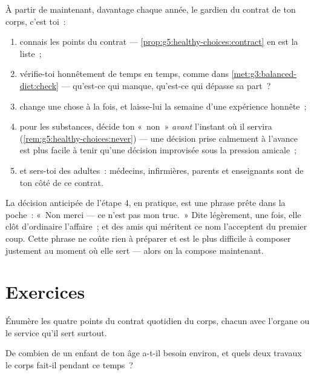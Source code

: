 \begin{method}\label{met:g5:healthy-choices:run}
À partir de maintenant, davantage chaque année, le gardien du
contrat de ton corps, c'est toi~:
\begin{enumerate}
  \item connais les points du contrat ---
        \cref{prop:g5:healthy-choices:contract} en est la liste~;
  \item vérifie-toi honnêtement de temps en temps, comme dans
        \cref{met:g3:balanced-diet:check} --- qu'est-ce qui manque,
        qu'est-ce qui dépasse sa part~?
  \item change une chose à la fois, et laisse-lui la semaine d'une
        expérience honnête~;
  \item pour les substances, décide ton «~non~» \emph{avant}
        l'instant où il servira
        (\cref{rem:g5:healthy-choices:never}) --- une décision
        prise calmement à l'avance est plus facile à tenir qu'une
        décision improvisée sous la pression amicale~;
  \item et sers-toi des adultes~: médecins, infirmières, parents et
        enseignants sont de ton côté de ce contrat.
\end{enumerate}
\end{method}

\begin{example}\label{ex:g5:healthy-choices:answers}
La décision anticipée de l'étape 4, en pratique, est une phrase
prête dans la poche~: «~Non merci --- ce n'est pas mon truc.~» Dite
légèrement, une fois, elle clôt d'ordinaire l'affaire~; et des amis
qui méritent ce nom l'acceptent du premier coup. Cette phrase ne
coûte rien à préparer et est le plus difficile à composer justement
au moment où elle sert --- alors on la compose maintenant.
\end{example}

\section{Exercices}

\begin{exercise}[$\star$]\label{exo:g5:healthy-choices:1}
Énumère les quatre points du contrat quotidien du corps, chacun avec
l'organe ou le service qu'il sert surtout.
\end{exercise}

\begin{exercise}[$\star$]\label{exo:g5:healthy-choices:2}
De combien de  un enfant de ton âge a-t-il besoin environ, et
quels deux travaux le corps fait-il pendant ce temps~?
\end{exercise}

